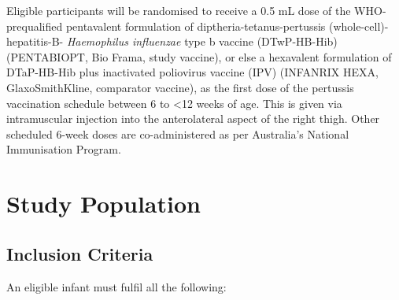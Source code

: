 \documentclass{bmcart}
\begin{document}
Eligible participants will be randomised to receive a 0.5 mL dose of the WHO-prequalified pentavalent formulation of diptheria-tetanus-pertussis (whole-cell)-hepatitis-B- \textit{Haemophilus influenzae} type b vaccine (DTwP-HB-Hib) (PENTABIO\textregistered PT, Bio Frama, study vaccine), or else a hexavalent formulation of DTaP-HB-Hib plus inactivated poliovirus vaccine (IPV) (INFANRIX HEXA\textregistered, GlaxoSmithKline, comparator vaccine), as the first dose of the pertussis vaccination schedule between 6 to \textless 12 weeks of age.
This is given via intramuscular injection into the anterolateral aspect of the right thigh.
Other scheduled 6-week doses are co-administered as per Australia's National Immunisation Program.

\section*{Study Population}

\subsection*{Inclusion Criteria}

An eligible infant must fulfil all the following:
\end{document}
